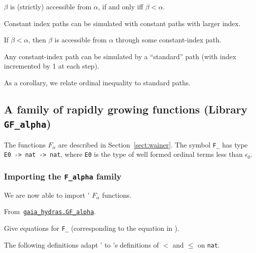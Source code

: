 $\beta$ is (strictly) accessible from $\alpha$, if and only iff
$\beta<\alpha$.


Constant index paths can be simulated with constant paths with larger index.



If $\beta<\alpha$, then $\beta$ is accessible from $\alpha$
through some constant-index path.


Any constant-index path can be simulated by a ``standard'' path (with index incremented by 1 at each step).


As a corollary, we relate ordinal inequality to standard paths.


\subsection{A family of rapidly growing functions
(Library \texttt{GF\_alpha})}

The functions $F_\alpha$ are described in Section~\vref{sect:wainer}. The symbol \texttt{F\_} has type \texttt{E0 -> nat -> nat},
where \texttt{E0} is the type of well formed ordinal terms less than $\epsilon_0$.

\subsubsection{Importing the \texttt{F\_alpha} family}

We are now able to import \HydrasLib' $F_\alpha$ functions.

From~\href{../theories/html/gaia_hydras.G~F_alpha.html}%
{\texttt{gaia\_hydras.GF\_alpha}}.


\begin{todo}
  Give equations for \texttt{F\_} (corresponding to the equation
  in \HydrasLib).
\end{todo}




The following definitions adapt \HydrasLib' to \ssreflect's 
definitions of $<$ and $\leq$ on \texttt{nat}.


